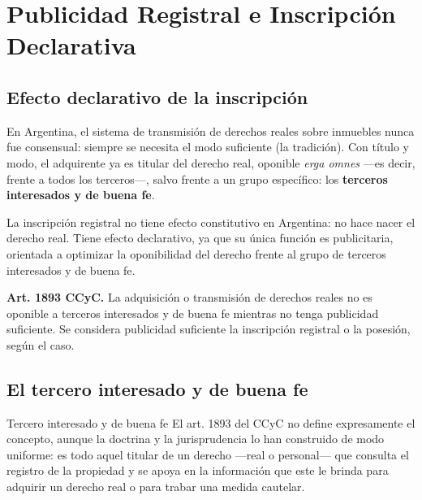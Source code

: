\documentclass[12pt,oneside]{book}
\begin{document}

\chapter{Publicidad Registral e Inscripción Declarativa}

\section{Efecto declarativo de la inscripción}

En Argentina, el sistema de transmisión de derechos reales sobre inmuebles nunca fue consensual: siempre se necesita el modo suficiente (la tradición). Con título y modo, el adquirente ya es titular del derecho real, oponible \textit{erga omnes} —es decir, frente a todos los terceros—, salvo frente a un grupo específico: los \textbf{terceros interesados y de buena fe}.

\begin{important}
La inscripción registral no tiene efecto constitutivo en Argentina: no hace nacer el derecho real. Tiene efecto declarativo, ya que su única función es publicitaria, orientada a optimizar la oponibilidad del derecho frente al grupo de terceros interesados y de buena fe.
\end{important}

\begin{note}
\textbf{Art. 1893 CCyC.} La adquisición o transmisión de derechos reales no es oponible a terceros interesados y de buena fe mientras no tenga publicidad suficiente. Se considera publicidad suficiente la inscripción registral o la posesión, según el caso.
\end{note}

\section{El tercero interesado y de buena fe}

\begin{definition}{Tercero interesado y de buena fe}
El art. 1893 del CCyC no define expresamente el concepto, aunque la doctrina y la jurisprudencia lo han construido de modo uniforme: es todo aquel titular de un derecho —real o personal— que consulta el registro de la propiedad y se apoya en la información que este le brinda para adquirir un derecho real o para trabar una medida cautelar.
\end{definition}
\end{document}
